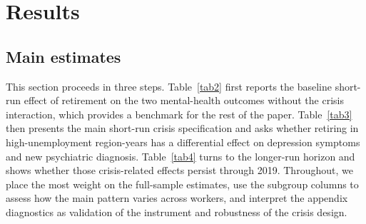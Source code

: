 \documentclass[arguments, manuscript, 11pt]{aastex631}
\begin{document}
\section{Results} \label{sec:result}
\subsection{Main estimates} \label{sec:results1}

This section proceeds in three steps. Table~\ref{tab2} first reports the baseline short-run effect of retirement on the two mental-health outcomes without the crisis interaction, which provides a benchmark for the rest of the paper. Table~\ref{tab3} then presents the main short-run crisis specification and asks whether retiring in high-unemployment region-years has a differential effect on depression symptoms and new psychiatric diagnosis. Table~\ref{tab4} turns to the longer-run horizon and shows whether those crisis-related effects persist through 2019. Throughout, we place the most weight on the full-sample estimates, use the subgroup columns to assess how the main pattern varies across workers, and interpret the appendix diagnostics as validation of the instrument and robustness of the crisis design.
\end{document}
